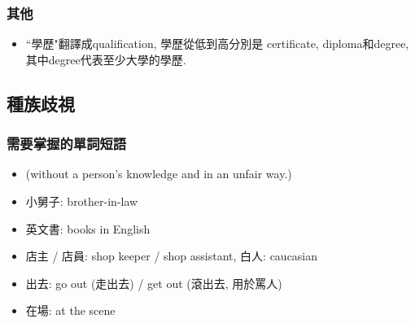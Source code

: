 \subsubsection*{其他}
\begin{itemize}
  \itemsep0em
  \item ``學歷"翻譯成qualification, 學歷從低到高分別是 certificate, diploma和degree, 其中degree代表至少大學的學歷.
\end{itemize}

\subsection{種族歧視}
\subsubsection*{需要掌握的單詞短語}
\begin{itemize}
  \itemsep0em
  \item {} (without a person's knowledge and in an unfair way.)
  \item 小舅子: brother-in-law
  \item 英文書: books in English
  \item 店主 / 店員: shop keeper / shop assistant, 白人: caucasian
  \item 出去: go out (走出去) / get out (滾出去, 用於罵人)
  \item 在場: at the scene
\end{itemize}

